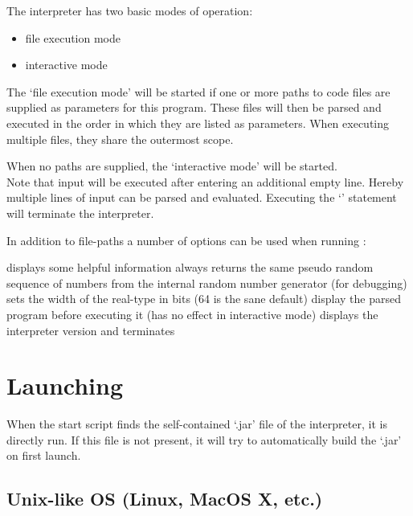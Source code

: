 The \setlX{} interpreter has two basic modes of operation:
\begin{itemize}
	\item file execution mode
	\item interactive mode
\end{itemize}

The `file execution mode' will be started if one or more paths to code files are supplied as parameters for this program. These files will then be parsed and executed in the order in which they are listed as parameters. When executing multiple files, they share the outermost scope.

When no paths are supplied, the `interactive mode' will be started.\\
Note that input will be executed after entering an additional empty line. Hereby multiple lines of input can be parsed and evaluated. Executing the `' statement will terminate the interpreter.


In addition to file-paths a number of options can be used when running \setlX{}:

\begin{itemize}
	      {displays some helpful information}
	      {always returns the same pseudo random sequence of numbers from the internal random number generator (for debugging)}
           {sets the width of the real-type in bits (64 is the sane default)}
           {display the parsed program before executing it (has no effect in interactive mode)}
           {displays the interpreter version and terminates}
\end{itemize}

\section{Launching}

When the start script finds the self-contained `.jar' file of the interpreter, it is directly run. If this file is not present, it will try to automatically build the `.jar' on first launch.

\subsection{Unix-like OS (Linux, MacOS X, etc.)}

